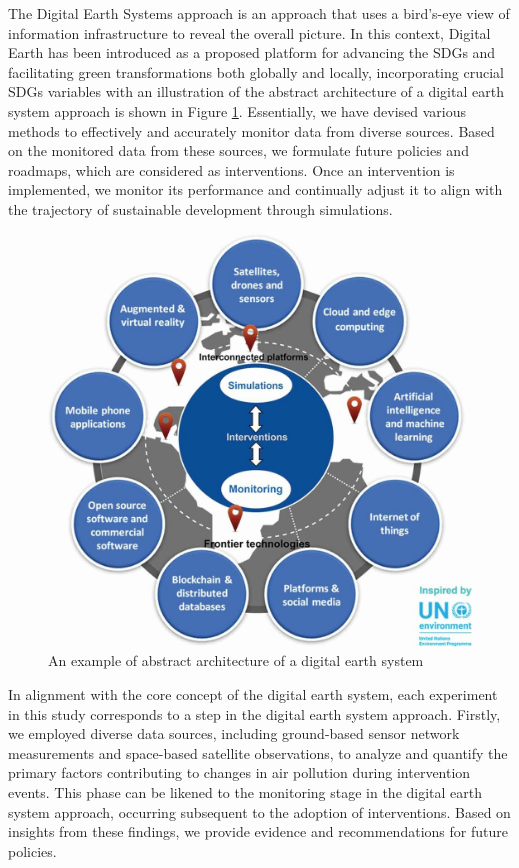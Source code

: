 The Digital Earth Systems approach is an approach that uses a bird's-eye view of information infrastructure to reveal the overall picture. In this context, Digital Earth has been introduced as a proposed platform for advancing the SDGs and facilitating green transformations both globally and locally, incorporating crucial SDGs variables \citep{fukui2021digital} with an illustration of the abstract architecture of a digital earth system approach is shown in Figure \ref{fig:chap2_fig7}. Essentially, we have devised various methods to effectively and accurately monitor data from diverse sources. Based on the monitored data from these sources, we formulate future policies and roadmaps, which are considered as interventions. Once an intervention is implemented, we monitor its performance and continually adjust it to align with the trajectory of sustainable development through simulations. \par
\begin{figure}[tbh!]
    \centering
    \includegraphics[width=\textwidth]{figs/chap2/digital_earth.jpg}
    \caption{An example of abstract architecture of a digital earth system \citep{fukui2021digital}}
    \label{fig:chap2_fig7}
\end{figure}

In alignment with the core concept of the digital earth system, each experiment in this study corresponds to a step in the digital earth system approach. Firstly, we employed diverse data sources, including ground-based sensor network measurements and space-based satellite observations, to analyze and quantify the primary factors contributing to changes in air pollution during intervention events. This phase can be likened to the monitoring stage in the digital earth system approach, occurring subsequent to the adoption of interventions. Based on insights from these findings, we provide evidence and recommendations for future policies. \par

